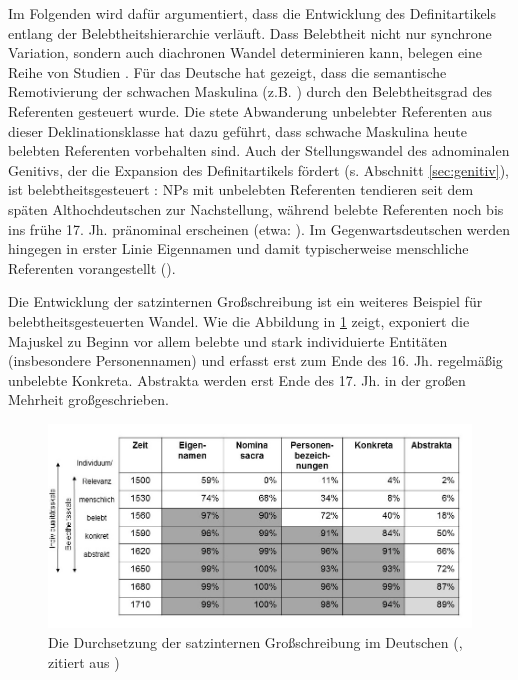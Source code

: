 Im Folgenden wird dafür argumentiert, dass die Entwicklung des Definitartikels entlang der Belebtheitshierarchie verläuft. Dass Belebtheit nicht nur synchrone Variation, sondern auch diachronen Wandel determinieren kann, belegen eine Reihe von Studien \parencite[vgl. die Übersicht in][]{Enger2011}. Für das Deutsche hat \textcite{Kopcke1995, Kopcke2000a,Kopcke2000,Kopcke2005} gezeigt, dass die semantische Remotivierung der schwachen Maskulina (z.B. )  durch den  Belebtheitsgrad des Referenten gesteuert wurde. Die stete Abwanderung unbelebter Referenten aus dieser Deklinationsklasse hat dazu geführt, dass schwache Maskulina heute belebten Referenten vorbehalten sind. 
Auch der Stellungswandel des adnominalen Genitivs, der die Expansion des Definitartikels fördert (s. Abschnitt  \ref{sec:genitiv}), ist belebtheitsgesteuert \parencite[215--223]{Demske2001}: NPs mit unbelebten Referenten tendieren seit dem späten Althochdeutschen zur Nachstellung, während belebte Referenten noch bis ins frühe 17. Jh. pränominal erscheinen (etwa: ). Im Gegenwartsdeutschen werden hingegen in erster Linie Eigennamen und damit typischerweise menschliche Referenten vorangestellt  ().   

Die Entwicklung der satzinternen Großschreibung \parencite{Bergmann1998,Bergmann1998a,Bergmann1999,Szczepaniak2011,Szczepaniak2016} ist ein weiteres Beispiel für belebtheitsgesteuerten Wandel. Wie die Abbildung in \ref{sgs} zeigt, exponiert die Majuskel zu Beginn vor allem belebte und stark individuierte Entitäten (insbesondere Personennamen) und erfasst erst zum Ende des 16. Jh. regelmäßig unbelebte Konkreta. Abstrakta werden erst Ende des 17. Jh. in der großen Mehrheit großgeschrieben.   

\begin{figure}
\begin{center}
\includegraphics[width=12cm]{images/SGS-bergmann-szczepaniak-neu.jpg}
\caption {Die Durchsetzung der satzinternen Großschreibung im Deutschen (\cite{Bergmann1999}, zitiert aus \cite[351]{Szczepaniak2011})}
\label{sgs}
\end{center}
\end{figure} 

